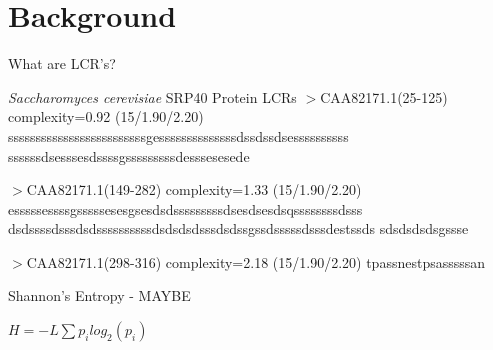 \documentclass{beamer}
\begin{document}
	\section{Background}
	\begin{frame}{What are LCR's?}
		\label{link1}
		
		\begin{block}{\textit{Saccharomyces cerevisiae} SRP40 Protein LCRs}
			$>$CAA82171.1(25-125) complexity=0.92 (15/1.90/2.20)
			sssssssssssssssssssssssssgessssssssssssssdssdssdsessssssssss
			ssssssdsesssesdssssgsssssssssdesssesesede \newline
			
			$>$CAA82171.1(149-282) complexity=1.33 (15/1.90/2.20)
			esssssessssgsssssesesgsesdsdsssssssssdsesdsesdsqssssssssdsss
			dsdssssdsssdsdssssssssssdsdsdsdsssdsdssgssdsssssdsssdestssds
			sdsdsdsdsgssse \newline
			
			$>$CAA82171.1(298-316) complexity=2.18 (15/1.90/2.20)
			tpassnestpsasssssan
			
		\end{block}		
		
	\end{frame}

	\begin{frame}{Shannon's Entropy - MAYBE }
		
			$H = -L\sum p_i log_2(p_i)$
		
	\end{frame}
\end{document}
